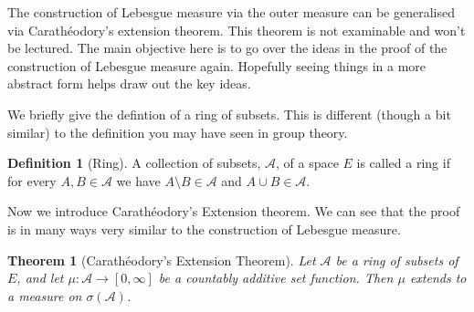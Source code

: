 \documentclass[
]{book}
\newtheorem{theorem}{Theorem}[chapter]
\theoremstyle{definition}
\newtheorem{definition}{Definition}[chapter]
\theoremstyle{definition}
\theoremstyle{definition}
\theoremstyle{definition}
\theoremstyle{remark}
\begin{document}
The construction of Lebesgue measure via the outer measure can be generalised via Carathéodory's extension theorem. This theorem is not examinable and won't be lectured. The main objective here is to go over the ideas in the proof of the construction of Lebesgue measure again. Hopefully seeing things in a more abstract form helps draw out the key ideas.

We briefly give the defintion of a ring of subsets. This is different (though a bit similar) to the definition you may have seen in group theory.

\begin{definition}[Ring]
A collection of subsets, \(\mathcal{A}\), of a space \(E\) is called a ring if for every \(A,B \in \mathcal{A}\) we have \(A \setminus B \in \mathcal{A}\) and \(A \cup B \in \mathcal{A}\).
\end{definition}

Now we introduce Carathéodory's Extension theorem. We can see that the proof is in many ways very similar to the construction of Lebesgue measure.

\begin{theorem}[Carathéodory's Extension Theorem]
Let \(\mathcal{A}\) be a ring of subsets of \(E\), and let \(\mu: \mathcal{A} \rightarrow [0, \infty]\) be a countably additive set function. Then \(\mu\) extends to a measure on \(\sigma(\mathcal{A})\).
\end{theorem}
\end{document}
